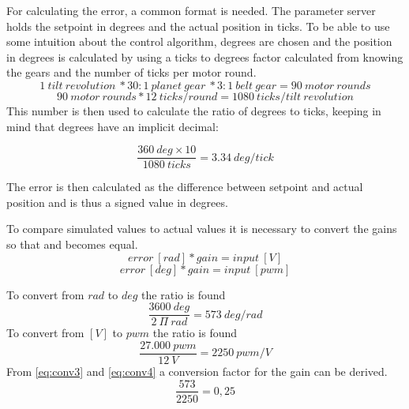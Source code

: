 For calculating the error, a common format is needed. The parameter server holds the setpoint in degrees and the actual position in ticks. To be able to use some intuition about the control algorithm, degrees are chosen and the position in degrees is calculated by using a ticks to degrees factor calculated from knowing the gears and the number of ticks per motor round.
\begin{equation}
1 \ tilt \ revolution \ * 30:1 \ planet \ gear \ * 3:1 \ belt \ gear = 90 \ motor \ rounds
\end{equation}
\begin{equation}
 90 \ motor \ rounds * 12 \ ticks/round = 1080 \ ticks/tilt \ revolution
\end{equation}
This number is then used to calculate the ratio of degrees to ticks, keeping in mind that degrees have an implicit decimal:

\begin{equation}
\frac{360 \ deg \times 10}{1080 \ ticks} = 3.34\ deg/tick 
\end{equation}

The error is then calculated as the difference between setpoint and actual position and is thus a signed value in degrees.

To compare simulated values to actual values it is necessary to convert the gains so that \label{eq:conv1} and \label{eq:conv2} becomes equal. 
\begin{equation}
error \ [rad] * gain = input \ [V]
\label{eq:conv1}
\end{equation}
\begin{equation}
error \ [deg] * gain = input \ [pwm]
\label{eq:conv2}
\end{equation}

To convert from $rad$ to $deg$ the ratio is found
\begin{equation}
\frac{3600 \ deg}{2 \ \Pi \ rad} = 573 \ deg/rad
\label{eq:conv3}
\end{equation}
To convert from $[V]$ to $pwm$ the ratio is found
\begin{equation}
\frac{27.000 \ pwm}{12 \ V} = 2250 \ pwm/V
\label{eq:conv4}
\end{equation}
From \ref{eq:conv3} and \ref{eq:conv4} a conversion factor for the gain can be derived.
\begin{equation}
\frac{573}{2250} = 0,25
\label{eq:conv}
\end{equation}

